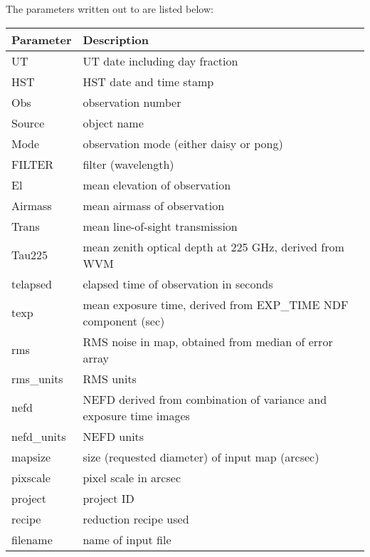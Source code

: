 The parameters written out to  are listed below:
\begin{table}[h!]
  \begin{center}
    \begin{tabular}{|p{2.5cm}|p{12cm}|}
      \hline
      \textbf{Parameter} & \textbf{Description}\\
      \hline
      UT & UT date including day fraction\\
      HST & HST date and time stamp \\
      Obs & observation number\\
      Source & object name\\
      Mode & observation mode (either daisy or pong)\\
      FILTER & filter (wavelength)\\
      El & mean elevation of observation\\
      Airmass & mean airmass of observation\\
      Trans & mean line-of-sight transmission\\
      Tau225 & mean zenith optical depth at 225 GHz, derived from WVM\\
      telapsed & elapsed time of observation in seconds\\
      texp & mean exposure time, derived from EXP\_TIME NDF component (sec)\\
      rms & RMS noise in map, obtained from median of error array\\
      rms\_units & RMS units\\
      nefd & NEFD derived from combination of variance and exposure time images\\
      nefd\_units & NEFD units\\
      mapsize & size (requested diameter) of input map (arcsec)\\
      pixscale & pixel scale in arcsec\\
      project & project ID\\
      recipe & reduction recipe used\\
      filename & name of input file\\
      \hline
    \end{tabular}
  \end{center}
\end{table}



